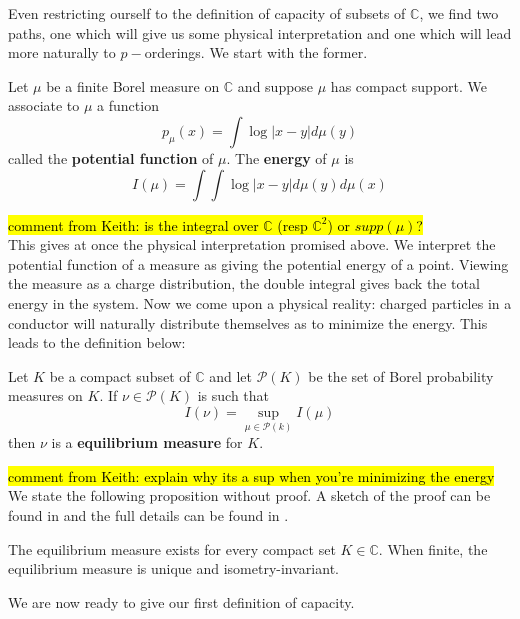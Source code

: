 Even restricting ourself to the definition of capacity of subsets of $\mathbb{C}$, we find two paths, one which will give us some physical interpretation and one which will lead more naturally to $p-$orderings. We start with the former.\\

\begin{definition} 
\cite{rand} Let $\mu$ be a finite Borel measure on $\mathbb{C}$ and suppose $\mu$ has compact support.  We associate to $\mu$ a function
\[p_\mu (x) =\int \log \lvert x - y \rvert d\mu(y)\] called the \textbf{potential function} of $\mu$. The \textbf{energy} of $\mu$ is 
\[I(\mu) =\int \int \log \lvert x - y \rvert d\mu(y) d\mu(x)\]
\end{definition}

\hl{comment from Keith:  is the integral over $\mathbb{C}$ (resp $\mathbb{C}^2$) or $supp(\mu)$?}\\
This gives at once the physical interpretation promised above. We interpret the potential function of a measure as giving the potential energy of a point. Viewing the measure as a charge distribution, the double integral gives back the total energy in the system. Now we come upon a physical reality: charged particles in a conductor will naturally distribute themselves as to minimize the energy. This leads to the definition below:\\

\begin{definition}
\cite{rand} Let $K$ be a compact subset of $\mathbb{C}$ and let $\mathcal{P}(K)$ be the set of Borel probability measures on $K$. If $\nu \in \mathcal{P}(K)$ is such that 
\[I(\nu) = \sup_{\mu \in \mathcal{P}(k)} I(\mu)\] then $\nu$ is a \textbf{equilibrium measure} for $K$.
\end{definition}

\hl{comment from Keith:  explain why its a sup when you're minimizing the energy}\\
We state the following proposition without proof. A sketch of the proof can be found in \cite{fp} and the full details can be found in \cite{rand}.\\

\begin{proposition}
\cite{rand} The equilibrium measure exists for every compact set $K \in \mathbb{C}$. When finite, the equilibrium measure is unique and isometry-invariant.
\end{proposition}

We are now ready to give our first definition of capacity.\\

